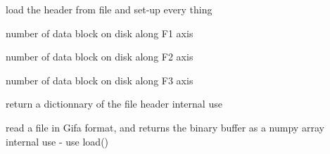 \documentclass[letterpaper,10pt,openany,oneside]{sphinxmanual}
\begin{document}
\begin{fulllineitems}
\begin{fulllineitems}
\end{fulllineitems}


\begin{fulllineitems}
\label{rst/code:File.GifaFile.GifaFile.load_header}
load the header from file and set-up every thing

\end{fulllineitems}


\begin{fulllineitems}
\label{rst/code:File.GifaFile.GifaFile.nblock1}
number of data block on disk along F1 axis

\end{fulllineitems}


\begin{fulllineitems}
\label{rst/code:File.GifaFile.GifaFile.nblock2}
number of data block on disk along F2 axis

\end{fulllineitems}


\begin{fulllineitems}
\label{rst/code:File.GifaFile.GifaFile.nblock3}
number of data block on disk along F3 axis

\end{fulllineitems}


\begin{fulllineitems}
\label{rst/code:File.GifaFile.GifaFile.read_header}
return a dictionnary of the file header
internal use

\end{fulllineitems}


\begin{fulllineitems}
\label{rst/code:File.GifaFile.GifaFile.readc}
read a file in Gifa format, and returns the binary buffer as a numpy array
internal use - use load()


\end{fulllineitems}
\end{fulllineitems}
\end{document}
